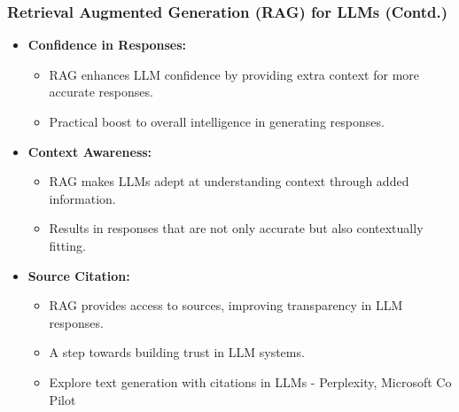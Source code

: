 \begin{frame}[fragile]\frametitle{Retrieval Augmented Generation (RAG) for LLMs (Contd.)}

\begin{itemize}
  \item \textbf{Confidence in Responses:}
    \begin{itemize}
      \item RAG enhances LLM confidence by providing extra context for more accurate responses.
      \item Practical boost to overall intelligence in generating responses.
    \end{itemize}
  
  \item \textbf{Context Awareness:}
    \begin{itemize}
      \item RAG makes LLMs adept at understanding context through added information.
      \item Results in responses that are not only accurate but also contextually fitting.
    \end{itemize}

  \item \textbf{Source Citation:}
    \begin{itemize}
      \item RAG provides access to sources, improving transparency in LLM responses.
      \item A step towards building trust in LLM systems.
      \item Explore text generation with citations in LLMs - Perplexity, Microsoft Co Pilot %
    \end{itemize}
\end{itemize}

\end{frame}

